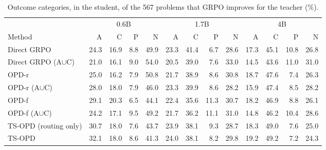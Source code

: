 \documentclass[10pt]{article}
\begin{document}
\begin{table}[h]
\centering
\scriptsize
\setlength{\tabcolsep}{3pt}
\caption{Outcome categories, in the student, of the 567 problems that GRPO improves for the teacher (\%).}
\label{tab:app-rq3}
\begin{tabular}{lrrrrrrrrrrrr}
\toprule
 & \multicolumn{4}{c}{0.6B} & \multicolumn{4}{c}{1.7B} & \multicolumn{4}{c}{4B} \\
\cmidrule(lr){2-5}\cmidrule(lr){6-9}\cmidrule(lr){10-13}
Method & A & C & P & N & A & C & P & N & A & C & P & N \\
\midrule
Direct GRPO & 24.3 & 16.9 & 8.8 & 49.9 & 23.3 & 41.4 & 6.7 & 28.6 & 17.3 & 45.1 & 10.8 & 26.8 \\
Direct GRPO (A$\cup$C) & 21.0 & 16.1 & 9.0 & 54.0 & 20.5 & 39.0 & 7.6 & 33.0 & 14.5 & 43.6 & 11.0 & 31.0 \\
OPD-r & 25.0 & 16.2 & 7.9 & 50.8 & 21.7 & 38.9 & 8.6 & 30.8 & 18.7 & 47.6 & 7.4 & 26.3 \\
OPD-r (A$\cup$C) & 28.0 & 18.0 & 7.9 & 46.0 & 23.3 & 39.9 & 8.6 & 28.2 & 15.9 & 47.4 & 8.5 & 28.2 \\
OPD-f & 29.1 & 20.3 & 6.5 & 44.1 & 22.4 & 35.6 & 11.3 & 30.7 & 18.2 & 46.9 & 8.8 & 26.1 \\
OPD-f (A$\cup$C) & 24.2 & 17.1 & 9.5 & 49.2 & 21.7 & 36.2 & 11.1 & 31.0 & 14.8 & 46.2 & 10.4 & 28.6 \\
TS-OPD (routing only) & 30.7 & 18.0 & 7.6 & 43.7 & 23.9 & 38.1 & 9.3 & 28.7 & 18.3 & 49.0 & 7.6 & 25.0 \\
TS-OPD & 32.1 & 18.0 & 8.6 & 41.3 & 24.0 & 38.1 & 8.2 & 29.8 & 19.2 & 49.2 & 7.2 & 24.3 \\
\bottomrule
\end{tabular}
\end{table}
\end{document}
